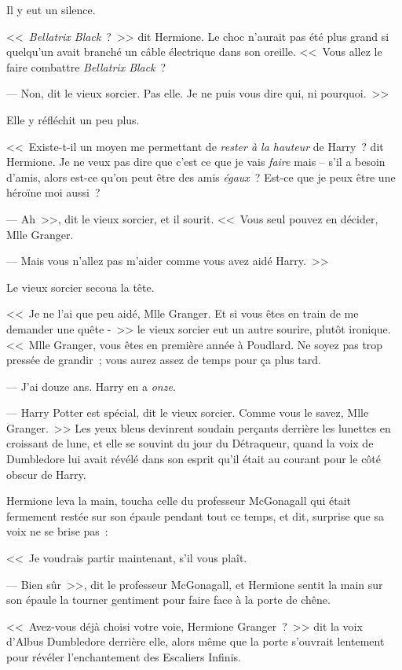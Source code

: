 Il y eut un silence.

<<~\emph{Bellatrix Black}~?~>> dit Hermione. Le choc n'aurait pas été plus grand si quelqu'un avait branché un câble électrique dans son oreille. <<~Vous allez le faire combattre \emph{Bellatrix Black}~?

--- Non, dit le vieux sorcier. Pas elle. Je ne puis vous dire qui, ni pourquoi.~>>

Elle y réfléchit un peu plus.

<<~Existe-t-il un moyen me permettant de \emph{rester à la hauteur} de Harry~? dit Hermione. Je ne veux pas dire que c'est ce que je vais \emph{faire} mais -- s'il a besoin d'amis, alors est-ce qu'on peut être des amis \emph{égaux}~? Est-ce que je peux être une héroïne moi aussi~?

--- Ah~>>, dit le vieux sorcier, et il sourit. <<~Vous seul pouvez en décider, Mlle Granger.

--- Mais vous n'allez pas m'aider comme vous avez aidé Harry.~>>

Le vieux sorcier secoua la tête.

<<~Je ne l'ai que peu aidé, Mlle Granger. Et si vous êtes en train de me demander une quête -~>> le vieux sorcier eut un autre sourire, plutôt ironique. <<~Mlle Granger, vous êtes en première année à Poudlard. Ne soyez pas trop pressée de grandir~; vous aurez assez de temps pour ça plus tard.

--- J'ai douze ans. Harry en a \emph{onze}.

--- Harry Potter est spécial, dit le vieux sorcier. Comme vous le savez, Mlle Granger.~>> Les yeux bleus devinrent soudain perçants derrière les lunettes en croissant de lune, et elle se souvint du jour du Détraqueur, quand la voix de Dumbledore lui avait révélé dans son esprit qu'il était au courant pour le côté obscur de Harry.

Hermione leva la main, toucha celle du professeur McGonagall qui était fermement restée sur son épaule pendant tout ce temps, et dit, surprise que sa voix ne se brise pas~:

<<~Je voudrais partir maintenant, s'il vous plaît.

--- Bien sûr~>>, dit le professeur McGonagall, et Hermione sentit la main sur son épaule la tourner gentiment pour faire face à la porte de chêne.

<<~Avez-vous déjà choisi votre voie, Hermione Granger~?~>> dit la voix d'Albus Dumbledore derrière elle, alors même que la porte s'ouvrait lentement pour révéler l'enchantement des Escaliers Infinis.

